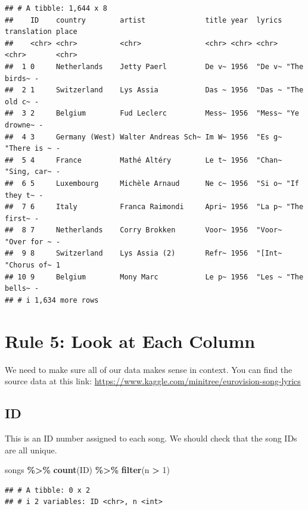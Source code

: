 \documentclass[
]{article}
\newenvironment{Shaded}{\begin{snugshade}}{\end{snugshade}}
\newcommand{\DecValTok}[1]{\textcolor[rgb]{0.00,0.00,0.81}{#1}}
\newcommand{\FunctionTok}[1]{\textcolor[rgb]{0.13,0.29,0.53}{\textbf{#1}}}
\newcommand{\NormalTok}[1]{#1}
\newcommand{\SpecialCharTok}[1]{\textcolor[rgb]{0.81,0.36,0.00}{\textbf{#1}}}
\begin{document}
\begin{verbatim}
## # A tibble: 1,644 x 8
##    ID    country        artist              title year  lyrics translation place
##    <chr> <chr>          <chr>               <chr> <chr> <chr>  <chr>       <chr>
##  1 0     Netherlands    Jetty Paerl         De v~ 1956  "De v~ "The birds~ -    
##  2 1     Switzerland    Lys Assia           Das ~ 1956  "Das ~ "The old c~ -    
##  3 2     Belgium        Fud Leclerc         Mess~ 1956  "Mess~ "Ye drowne~ -    
##  4 3     Germany (West) Walter Andreas Sch~ Im W~ 1956  "Es g~ "There is ~ -    
##  5 4     France         Mathé Altéry        Le t~ 1956  "Chan~ "Sing, car~ -    
##  6 5     Luxembourg     Michèle Arnaud      Ne c~ 1956  "Si o~ "If they t~ -    
##  7 6     Italy          Franca Raimondi     Apri~ 1956  "La p~ "The first~ -    
##  8 7     Netherlands    Corry Brokken       Voor~ 1956  "Voor~ "Over for ~ -    
##  9 8     Switzerland    Lys Assia (2)       Refr~ 1956  "[Int~ "Chorus of~ 1    
## 10 9     Belgium        Mony Marc           Le p~ 1956  "Les ~ "The bells~ -    
## # i 1,634 more rows
\end{verbatim}

\section{Rule 5: Look at Each Column}\label{rule-5-look-at-each-column}

We need to make sure all of our data makes sense in context. You can
find the source data at this link:
\url{https://www.kaggle.com/minitree/eurovision-song-lyrics}

\subsection{ID}\label{id}

This is an ID number assigned to each song. We should check that the
song IDs are all unique.

\begin{Shaded}
\begin{Highlighting}[]
\NormalTok{songs }\SpecialCharTok{\%\textgreater{}\%} \FunctionTok{count}\NormalTok{(ID) }\SpecialCharTok{\%\textgreater{}\%} \FunctionTok{filter}\NormalTok{(n }\SpecialCharTok{\textgreater{}} \DecValTok{1}\NormalTok{)}
\end{Highlighting}
\end{Shaded}

\begin{verbatim}
## # A tibble: 0 x 2
## # i 2 variables: ID <chr>, n <int>
\end{verbatim}
\end{document}
